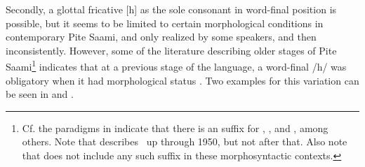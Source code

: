 Secondly, a glottal fricative [h] as the sole consonant in word-final position is possible, but it seems to be limited to certain morphological conditions in contemporary Pite Saami, and only realized by some speakers, and then inconsistently. 
However, some of the literature describing older stages of Pite Saami\footnote{Cf. the paradigms in \citet[150-159]{Lehtiranta1992} indicate that there is an  suffix for , ,  and , among others. Note that \citet{Lehtiranta1992} describes \PS\ up through 1950, but not after that. Also note that \citet[104;120]{Lagercrantz1926} does not include any such suffix in these morphosyntactic contexts.} indicates that at a previous stage of the language, a word-final /h/ was obligatory when it had morphological status%
. Two examples for this variation can be seen in  and .
\ea\label{work2SGPRS}
\z
\ea\label{fishDIMGENSG}
\z



